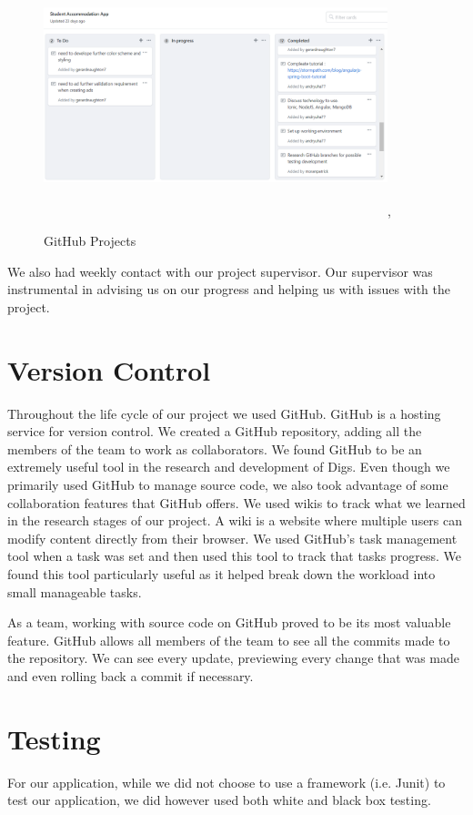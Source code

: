 \begin{figure}[h]
\centering
\includegraphics[width=10cm, height=7cm]{img/github_projects.PNG},
\caption{GitHub Projects}
\label{github_projects}
\end{figure}

\noindent We also had weekly contact with our project supervisor. Our supervisor was instrumental in advising us on our progress and helping us with issues with the project.

\section{Version Control}
Throughout the life cycle of our project we used GitHub. GitHub is a hosting service for version control. We created a GitHub repository, adding all the members of the team to work as collaborators. We found GitHub to be an extremely useful tool in the research and development of Digs. Even though we primarily used GitHub to manage source code, we also took advantage of some collaboration features that GitHub offers. We used wikis to track what we learned in the research stages of our project. A wiki is a website where multiple users can modify content directly from their browser. We used GitHub’s task management tool when a task was set and then used this tool to track that tasks progress.  We found this tool particularly useful as it helped break down the workload into small manageable tasks.

\noindent As a team, working with source code on GitHub proved to be its most valuable feature. GitHub allows all members of the team to see all the commits made to the repository. We can see every update, previewing every change that was made and even rolling back a commit if necessary.

\section{Testing}
For our application, while we did not choose to use a framework (i.e. Junit) to test our application, we did however used both white and black box testing.

